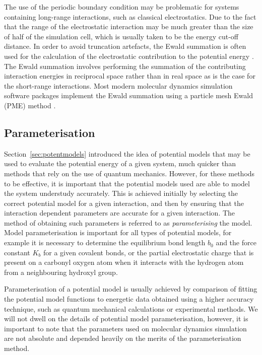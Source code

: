 The use of the periodic boundary condition may be problematic for systems containing long-range interactions, such as classical electrostatics.
Due to the fact that the range of the electrostatic interaction may be much greater than the size of half of the simulation cell, which is usually taken to be the energy cut-off distance.
In order to avoid truncation artefacts, the Ewald summation is often used for the calculation of the electrostatic contribution to the potential energy \cite{ewald_berechnung_1921}.
The Ewald summation involves performing the summation of the contributing interaction energies in reciprocal space rather than in real space as is the case for the short-range interactions.
Most modern molecular dynamics simulation software packages implement the Ewald summation using a particle mesh Ewald (PME) method \cite{essmann_smooth_1995}.

\subsection{Parameterisation}
\label{sec:parameterisation}
Section~\ref{sec:potentmodels} introduced the idea of potential models that may be used to evaluate the potential energy of a given system, much quicker than methods that rely on the use of quantum mechanics.
However, for these methods to be effective, it is important that the potential models used are able to model the system understudy accurately.
This is achieved initially by selecting the correct potential model for a given interaction, and then by ensuring that the interaction dependent parameters are accurate for a given interaction.
The method of obtaining such parameters is referred to as \emph{parameterising} the model.
Model parameterisation is important for all types of potential models, for example it is necessary to determine the equilibrium bond length $b_0$ and the force constant $K_b$ for a given covalent bonds, or the partial electrostatic charge that is present on a carbonyl oxygen atom when it interacts with the hydrogen atom from a neighbouring hydroxyl group.

Parameterisation of a potential model is usually achieved by comparison of fitting the potential model functions to energetic data obtained using a higher accuracy technique, such as quantum mechanical calculations or experimental methods.
We will not dwell on the details of potential model parameterisation, however, it is important to note that the parameters used on molecular dynamics simulation are not absolute and depended heavily on the merits of the parameterisation method.

